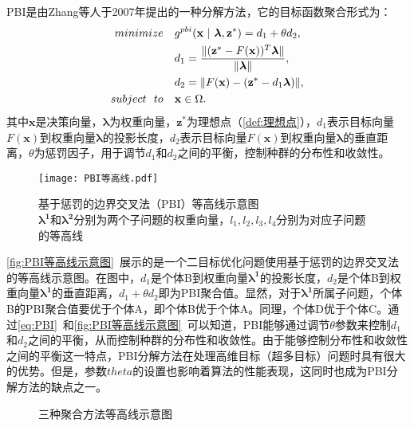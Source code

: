 PBI是由Zhang等人于2007年提出的一种分解方法\cite{zhang2007moea}，它的目标函数聚合形式为：
\begin{align}
    \label{eq:PBI}
    minimize \quad & g^{pbi}(\mathbf{x} \ | \ \boldsymbol{\lambda},\mathbf{z}^*) = d_1 + \theta d_2, \\
    & d_1 = \frac{\| (\mathbf{z}^* - F(\mathbf{x}))^T \boldsymbol{\lambda} \Vert }{ \|  \boldsymbol{\lambda} \Vert }, \notag\\
    & d_2 = \| F(\mathbf{x}) - (\mathbf{z}^* - d_1 \boldsymbol{\lambda}) \Vert, \notag \\
    subject \ \ to \quad & \mathbf{x} \in \Omega. \notag
\end{align}
其中$\mathbf{x}$是决策向量，$\boldsymbol{\lambda}$为权重向量，$\mathbf{z}^*$为理想点（\autoref{def:理想点}），$d_1$表示目标向量$F(\mathbf{x})$到权重向量$\boldsymbol{\lambda}$的投影长度，$d_2$表示目标向量$F(\mathbf{x})$到权重向量$\boldsymbol{\lambda}$的垂直距离，$\theta$为惩罚因子，用于调节$d_1$和$d_2$之间的平衡，控制种群的分布性和收敛性。
\par
\begin{figure}[htb]
    \texttt{[image: PBI等高线.pdf]}
    \caption[基于惩罚的边界交叉法（PBI）等高线示意图]{基于惩罚的边界交叉法（PBI）等高线示意图 \\ $\boldsymbol{\lambda^1}$和$\boldsymbol{\lambda^2}$分别为两个子问题的权重向量，$l_1, l_2, l_3, l_4$分别为对应子问题的等高线}
    \label{fig:PBI等高线示意图}
\end{figure}
\par
\autoref{fig:PBI等高线示意图}~展示的是一个二目标优化问题使用基于惩罚的边界交叉法的等高线示意图。在图中，$d_1$是个体B到权重向量$\boldsymbol{\lambda^1}$的投影长度，$d_2$是个体B到权重向量$\boldsymbol{\lambda^1}$的垂直距离，$d_1+\theta d_2$即为PBI聚合值。显然，对于$\boldsymbol{\lambda^1}$所属子问题，个体B的PBI聚合值要优于个体A，即个体B优于个体A。同理，个体D优于个体C。通过\autoref{eq:PBI}~和\autoref{fig:PBI等高线示意图}~可以知道，PBI能够通过调节$\theta$参数来控制$d_1$和$d_2$之间的平衡，从而控制种群的分布性和收敛性。由于能够控制分布性和收敛性之间的平衡这一特点，PBI分解方法在处理高维目标（超多目标）问题时具有很大的优势。但是，参数$theta$的设置也影响着算法的性能表现，这同时也成为PBI分解方法的缺点之一。

\begin{figure}[htb]
    \caption{三种聚合方法等高线示意图}
    \label{fig:三种聚合方法等高线示意图}
\end{figure}